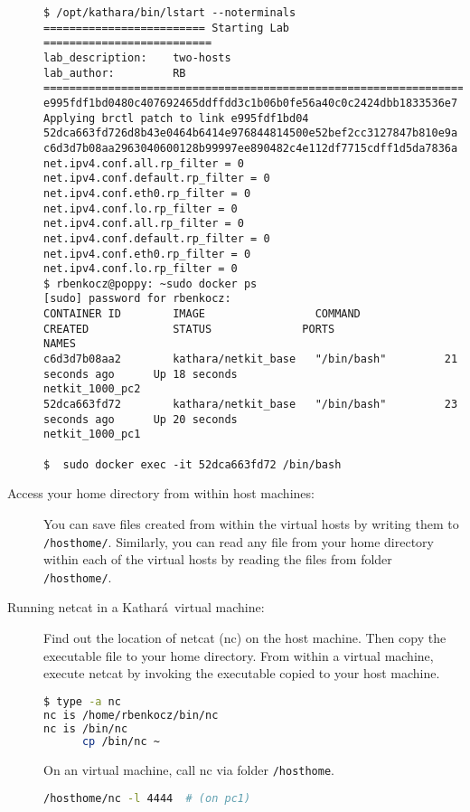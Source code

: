 \documentclass[12pt]{book}
\newcommand{\kathara}{Kathar\'a}
\begin{document}
\begin{description}
  {\small
  \begin{verbatim}
$ /opt/kathara/bin/lstart --noterminals
========================= Starting Lab ==========================
lab_description:    two-hosts
lab_author:         RB
=================================================================
e995fdf1bd0480c407692465ddffdd3c1b06b0fe56a40c0c2424dbb1833536e7
Applying brctl patch to link e995fdf1bd04
52dca663fd726d8b43e0464b6414e976844814500e52bef2cc3127847b810e9a
c6d3d7b08aa2963040600128b99997ee890482c4e112df7715cdff1d5da7836a
net.ipv4.conf.all.rp_filter = 0
net.ipv4.conf.default.rp_filter = 0
net.ipv4.conf.eth0.rp_filter = 0
net.ipv4.conf.lo.rp_filter = 0
net.ipv4.conf.all.rp_filter = 0
net.ipv4.conf.default.rp_filter = 0
net.ipv4.conf.eth0.rp_filter = 0
net.ipv4.conf.lo.rp_filter = 0
$ rbenkocz@poppy: ~sudo docker ps
[sudo] password for rbenkocz: 
CONTAINER ID        IMAGE                 COMMAND             CREATED             STATUS              PORTS               NAMES
c6d3d7b08aa2        kathara/netkit_base   "/bin/bash"         21 seconds ago      Up 18 seconds                           netkit_1000_pc2
52dca663fd72        kathara/netkit_base   "/bin/bash"         23 seconds ago      Up 20 seconds                           netkit_1000_pc1

$  sudo docker exec -it 52dca663fd72 /bin/bash
\end{verbatim}
  }


  \item[Access your home directory from within host machines:] You can
    save files created from within the virtual hosts by writing them
    to \verb$/hosthome/$. Similarly, you can read any file from your
    home directory within each of the virtual hosts by reading the
    files from folder \verb$/hosthome/$.

  \item[Running netcat in a \kathara\ virtual machine:] Find out the
    location of netcat (nc) on the host machine. Then copy the
    executable file to your home directory. From within a virtual
    machine, execute netcat by invoking the executable copied to your
    host machine.
 
    \begin{lstlisting}[language=bash]
      $ type -a nc
nc is /home/rbenkocz/bin/nc
nc is /bin/nc
      cp /bin/nc ~
    \end{lstlisting}

    On an virtual machine, call nc via folder \verb$/hosthome$.
    \begin{lstlisting}[language=bash]
      /hosthome/nc -l 4444  # (on pc1)


\end{lstlisting}
\end{description}
\end{document}
